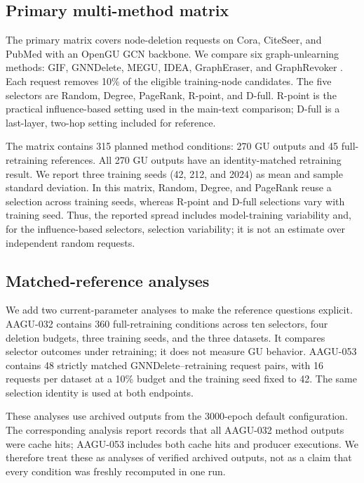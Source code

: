 \subsection{Primary multi-method matrix}
The primary matrix covers node-deletion requests on Cora, CiteSeer, and PubMed with an OpenGU GCN backbone. We compare six graph-unlearning methods: GIF, GNNDelete, MEGU, IDEA, GraphEraser, and GraphRevoker \cite{wu2023gif,cheng2023gnndelete,li2024towards,dong2024idea,chen2022graph}. Each request removes 10\% of the eligible training-node candidates. The five selectors are Random, Degree, PageRank, R-point, and D-full. R-point is the practical influence-based setting used in the main-text comparison; D-full is a last-layer, two-hop setting included for reference.

The matrix contains 315 planned method conditions: 270 GU outputs and 45 full-retraining references. All 270 GU outputs have an identity-matched retraining result. We report three training seeds (42, 212, and 2024) as mean and sample standard deviation. In this matrix, Random, Degree, and PageRank reuse a selection across training seeds, whereas R-point and D-full selections vary with training seed. Thus, the reported spread includes model-training variability and, for the influence-based selectors, selection variability; it is not an estimate over independent random requests.


\subsection{Matched-reference analyses}
We add two current-parameter analyses to make the reference questions explicit. AAGU-032 contains 360 full-retraining conditions across ten selectors, four deletion budgets, three training seeds, and the three datasets. It compares selector outcomes under retraining; it does not measure GU behavior. AAGU-053 contains 48 strictly matched GNNDelete--retraining request pairs, with 16 requests per dataset at a 10\% budget and the training seed fixed to 42. The same selection identity is used at both endpoints.

These analyses use archived outputs from the 3000-epoch default configuration. The corresponding analysis report records that all AAGU-032 method outputs were cache hits; AAGU-053 includes both cache hits and producer executions. We therefore treat these as analyses of verified archived outputs, not as a claim that every condition was freshly recomputed in one run.

